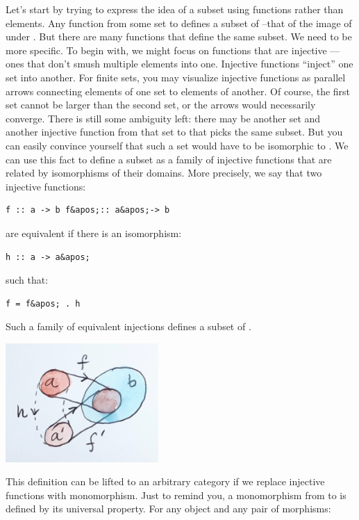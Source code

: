 Let's start by trying to express the idea of a subset using functions
rather than elements. Any function  from some set 
to  defines a subset of --that of the image of
 under . But there are many functions that define
the same subset. We need to be more specific. To begin with, we might
focus on functions that are injective --- ones that don't smush multiple
elements into one. Injective functions ``inject'' one set into another.
For finite sets, you may visualize injective functions as parallel
arrows connecting elements of one set to elements of another. Of course,
the first set cannot be larger than the second set, or the arrows would
necessarily converge. There is still some ambiguity left: there may be
another set  and another injective function
 from that set to  that picks the same
subset. But you can easily convince yourself that such a set would have
to be isomorphic to . We can use this fact to define a subset
as a family of injective functions that are related by isomorphisms of
their domains. More precisely, we say that two injective functions:

\begin{verbatim}
f :: a -> b f&apos;:: a&apos;-> b
\end{verbatim}

are equivalent if there is an isomorphism:

\begin{verbatim}
h :: a -> a&apos;
\end{verbatim}

such that:

\begin{verbatim}
f = f&apos; . h
\end{verbatim}

Such a family of equivalent injections defines a subset of .

\includegraphics[width=2.29167in]{images/subsetinjection.jpg}

This definition can be lifted to an arbitrary category if we replace
injective functions with monomorphism. Just to remind you, a
monomorphism  from  to  is defined by its
universal property. For any object  and any pair of morphisms:

